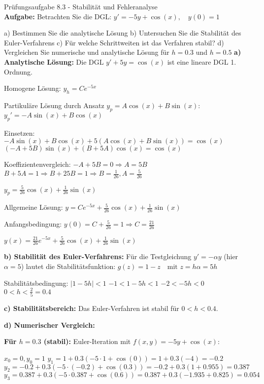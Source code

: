 \begin{example2}{Prüfungsaufgabe 8.3 - Stabilität und Fehleranalyse}\\
\textbf{Aufgabe:} Betrachten Sie die DGL:
$y' = -5y + \cos(x), \quad y(0) = 1$

a) Bestimmen Sie die analytische Lösung
b) Untersuchen Sie die Stabilität des Euler-Verfahrens  
c) Für welche Schrittweiten ist das Verfahren stabil?
d) Vergleichen Sie numerische und analytische Lösung für $h = 0.3$ und $h = 0.5$
\tcblower
\textbf{a) Analytische Lösung:}
Die DGL $y' + 5y = \cos(x)$ ist eine lineare DGL 1. Ordnung.

Homogene Lösung: $y_h = Ce^{-5x}$

Partikuläre Lösung durch Ansatz $y_p = A\cos(x) + B\sin(x)$:
$y_p' = -A\sin(x) + B\cos(x)$

Einsetzen: $-A\sin(x) + B\cos(x) + 5(A\cos(x) + B\sin(x)) = \cos(x)$
$(-A + 5B)\sin(x) + (B + 5A)\cos(x) = \cos(x)$

Koeffizientenvergleich:
$-A + 5B = 0 \Rightarrow A = 5B$
$B + 5A = 1 \Rightarrow B + 25B = 1 \Rightarrow B = \frac{1}{26}, A = \frac{5}{26}$

$y_p = \frac{5}{26}\cos(x) + \frac{1}{26}\sin(x)$

Allgemeine Lösung: $y = Ce^{-5x} + \frac{5}{26}\cos(x) + \frac{1}{26}\sin(x)$

Anfangsbedingung: $y(0) = C + \frac{5}{26} = 1 \Rightarrow C = \frac{21}{26}$

$y(x) = \frac{21}{26}e^{-5x} + \frac{5}{26}\cos(x) + \frac{1}{26}\sin(x)$

\textbf{b) Stabilität des Euler-Verfahrens:}
Für die Testgleichung $y' = -\alpha y$ (hier $\alpha = 5$) lautet die Stabilitätsfunktion:
$g(z) = 1 - z \quad \text{mit } z = h\alpha = 5h$

Stabilitätsbedingung: $|1 - 5h| < 1$
$-1 < 1 - 5h < 1$
$-2 < -5h < 0$
$0 < h < \frac{2}{5} = 0.4$

\textbf{c) Stabilitätsbereich:}
Das Euler-Verfahren ist stabil für $0 < h < 0.4$.

\textbf{d) Numerischer Vergleich:}

\textbf{Für $h = 0.3$ (stabil):}
Euler-Iteration mit $f(x,y) = -5y + \cos(x)$:

$x_0 = 0, y_0 = 1$
$y_1 = 1 + 0.3(-5 \cdot 1 + \cos(0)) = 1 + 0.3(-4) = -0.2$
$y_2 = -0.2 + 0.3(-5 \cdot (-0.2) + \cos(0.3)) = -0.2 + 0.3(1 + 0.955) = 0.387$
$y_3 = 0.387 + 0.3(-5 \cdot 0.387 + \cos(0.6)) = 0.387 + 0.3(-1.935 + 0.825) = 0.054$


\end{example2}
